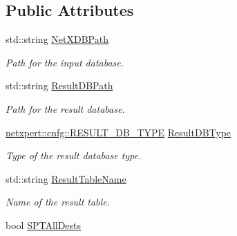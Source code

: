 \subsection*{Public Attributes}
\begin{DoxyCompactItemize}
\item 
std\+::string \hyperlink{structnetxpert_1_1cnfg_1_1Config_abfbfd2126c7d8e675f1c786cf7a1004a}{Net\+X\+D\+B\+Path}\hypertarget{structnetxpert_1_1cnfg_1_1Config_abfbfd2126c7d8e675f1c786cf7a1004a}{}\label{structnetxpert_1_1cnfg_1_1Config_abfbfd2126c7d8e675f1c786cf7a1004a}

\begin{DoxyCompactList}\small\item\em Path for the input database. \end{DoxyCompactList}\item 
std\+::string \hyperlink{structnetxpert_1_1cnfg_1_1Config_a11f88b978f21663025714bff816cfe86}{Result\+D\+B\+Path}\hypertarget{structnetxpert_1_1cnfg_1_1Config_a11f88b978f21663025714bff816cfe86}{}\label{structnetxpert_1_1cnfg_1_1Config_a11f88b978f21663025714bff816cfe86}

\begin{DoxyCompactList}\small\item\em Path for the result database. \end{DoxyCompactList}\item 
\hyperlink{namespacenetxpert_1_1cnfg_a235b32f52360f5f331279b34e85064a5}{netxpert\+::cnfg\+::\+R\+E\+S\+U\+L\+T\+\_\+\+D\+B\+\_\+\+T\+Y\+PE} \hyperlink{structnetxpert_1_1cnfg_1_1Config_a088abe76a5f5b531b7294122b1a63542}{Result\+D\+B\+Type}\hypertarget{structnetxpert_1_1cnfg_1_1Config_a088abe76a5f5b531b7294122b1a63542}{}\label{structnetxpert_1_1cnfg_1_1Config_a088abe76a5f5b531b7294122b1a63542}

\begin{DoxyCompactList}\small\item\em Type of the result database type. \end{DoxyCompactList}\item 
std\+::string \hyperlink{structnetxpert_1_1cnfg_1_1Config_a365d31191baf6a1bc7b700e949c1ac05}{Result\+Table\+Name}\hypertarget{structnetxpert_1_1cnfg_1_1Config_a365d31191baf6a1bc7b700e949c1ac05}{}\label{structnetxpert_1_1cnfg_1_1Config_a365d31191baf6a1bc7b700e949c1ac05}

\begin{DoxyCompactList}\small\item\em Name of the result table. \end{DoxyCompactList}\item 
bool \hyperlink{structnetxpert_1_1cnfg_1_1Config_a899d7ea93cedfb52addfd6ba9dc23ef8}{S\+P\+T\+All\+Dests}\hypertarget{structnetxpert_1_1cnfg_1_1Config_a899d7ea93cedfb52addfd6ba9dc23ef8}{}\label{structnetxpert_1_1cnfg_1_1Config_a899d7ea93cedfb52addfd6ba9dc23ef8}


\end{DoxyCompactItemize}
